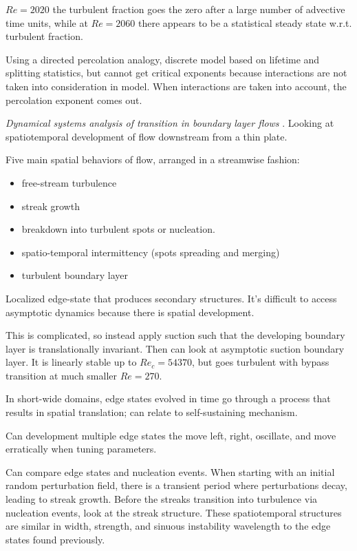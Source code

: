 \begin{description}
{\begin{description}
$Re = 2020$ the turbulent fraction goes
the zero after a large number of advective time units,
while at $Re = 2060$ there appears to be a statistical
steady state w.r.t. turbulent fraction.

Using a directed percolation analogy,
discrete model based on lifetime and splitting statistics, but cannot get
critical exponents because interactions
are not taken into consideration in model. When interactions are taken
into account, the percolation exponent comes out.

\item[B. Eckhardt Talk]
\textit{Dynamical systems analysis of transition in boundary layer flows}
.
Looking at spatiotemporal development of flow downstream from a thin plate.

Five main spatial behaviors of flow, arranged in a streamwise fashion:
\begin{itemize}
\item free-stream turbulence
\item streak growth
\item breakdown into turbulent spots or nucleation.
\item spatio-temporal intermittency (spots spreading and merging)
\item turbulent boundary layer
\end{itemize}

Localized edge-state that produces secondary structures. It's difficult to
access asymptotic dynamics because there is spatial development.

This is complicated, so instead apply
suction such that the developing boundary layer is translationally
invariant. Then can look at asymptotic
suction boundary layer. It is linearly
stable up to $Re_c = 54370$, but goes
turbulent with bypass transition at
much smaller $Re = 270$.

In short-wide domains, edge states evolved in time go through a
process that results in spatial translation; can
relate to self-sustaining mechanism.

Can development multiple edge states the move left, right, oscillate,
and move erratically when tuning parameters.

Can compare edge states and nucleation events. When starting with an initial
random perturbation field, there is a transient period where perturbations decay,
leading to streak growth. Before
the streaks transition into turbulence via nucleation events,
look at the streak structure. These spatiotemporal
structures are similar in width, strength, and sinuous instability
 wavelength to the edge states found previously.


\end{description}}
\end{description}
